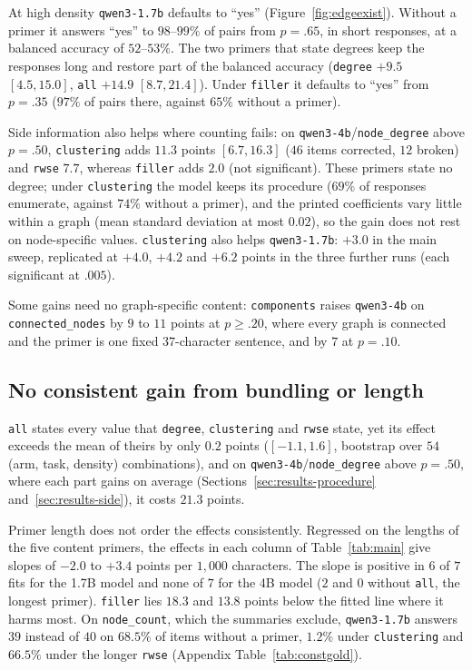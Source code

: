 \documentclass[11pt]{article}
\begin{document}
At high density \texttt{qwen3-1.7b} defaults to ``yes''
(Figure~\ref{fig:edgeexist}). Without a primer it answers ``yes'' to
$98$--$99\%$ of pairs from $p{=}.65$, in short responses, at a balanced
accuracy of $52$--$53\%$. The two primers that state degrees keep the
responses long and restore part of the balanced accuracy (\texttt{degree} $+9.5$ $[4.5, 15.0]$, \texttt{all} $+14.9$
$[8.7, 21.4]$). Under \texttt{filler} it defaults to ``yes'' from $p{=}.35$
($97\%$ of pairs there, against $65\%$ without a primer).

Side information also helps where counting fails: on
\texttt{qwen3-4b}/\texttt{node\_degree} above $p{=}.50$, \texttt{clustering}
adds $11.3$ points $[6.7, 16.3]$ ($46$ items corrected, $12$ broken) and
\texttt{rwse} $7.7$, whereas \texttt{filler} adds $2.0$ (not significant).
These primers state no degree; under \texttt{clustering} the model keeps its
procedure ($69\%$ of responses enumerate, against $74\%$ without a primer), and
the printed coefficients vary little within a graph (mean standard deviation
at most $0.02$), so the gain does not rest on node-specific values.
\texttt{clustering} also helps \texttt{qwen3-1.7b}: $+3.0$ in the main sweep,
replicated at $+4.0$, $+4.2$ and $+6.2$ points in the three further runs (each
significant at $.005$).

Some gains need no graph-specific content: \texttt{components} raises
\texttt{qwen3-4b} on \texttt{connected\_nodes} by $9$ to $11$ points at
$p\ge.20$, where every graph is connected and the primer is one fixed
$37$-character sentence, and by $7$ at $p{=}.10$.

\subsection{No consistent gain from bundling or length}
\label{sec:results-bundle}

\texttt{all} states every value that \texttt{degree}, \texttt{clustering} and
\texttt{rwse} state, yet its effect exceeds the mean of theirs by only $0.2$
points ($[-1.1, 1.6]$, bootstrap over $54$ (arm, task, density)
combinations), and on \texttt{qwen3-4b}/\texttt{node\_degree} above $p{=}.50$,
where each part gains on average (Sections~\ref{sec:results-procedure}
and~\ref{sec:results-side}), it costs $21.3$ points.

Primer length does not order the effects consistently. Regressed on the
lengths of the five content primers, the effects in each column of
Table~\ref{tab:main} give slopes of $-2.0$ to $+3.4$ points per $1{,}000$
characters. The slope is positive in $6$ of $7$ fits for the 1.7B model and
none of $7$ for the 4B model ($2$ and $0$ without \texttt{all}, the longest
primer).
\texttt{filler} lies $18.3$ and $13.8$ points below the fitted line
where it harms most. On
\texttt{node\_count}, which the summaries exclude, \texttt{qwen3-1.7b} answers
$39$ instead of $40$ on $68.5\%$ of items without a primer, $1.2\%$ under
\texttt{clustering} and $66.5\%$ under the longer \texttt{rwse} (Appendix
Table~\ref{tab:constgold}).
\end{document}
